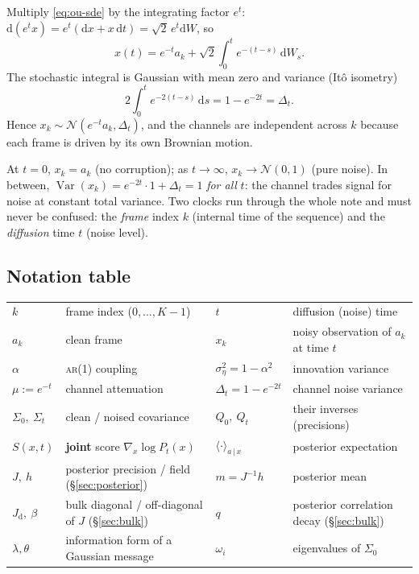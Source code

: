 \documentclass[11pt]{article}
\theoremstyle{definition}
\newcommand{\N}{\mathcal{N}}
\newcommand{\Sig}{\Sigma}
\newcommand{\Dt}{\Delta_t}
\newcommand{\Qt}{Q_t}
\newcommand{\given}{\,|\,}
\newcommand{\dd}{\mathrm{d}}
\newcommand{\Jd}{J_{\mathrm d}}
\DeclareMathOperator{\Var}{Var}
\begin{document}
\begin{derivation}
Multiply \eqref{eq:ou-sde} by the integrating factor $e^{t}$:
$\dd(e^{t}x)=e^{t}(\dd x+x\,\dd t)=\sqrt2\,e^{t}\dd W$, so
\[
  x(t)=e^{-t}a_k+\sqrt2\int_0^t e^{-(t-s)}\,\dd W_s .
\]
The stochastic integral is Gaussian with mean zero and variance (It\^o
isometry)
\[
  2\int_0^t e^{-2(t-s)}\,\dd s=1-e^{-2t}=\Dt .
\]
Hence $x_k\sim\N(e^{-t}a_k,\Dt)$, and the channels are independent across $k$
because each frame is driven by its own Brownian motion.
\end{derivation}

\begin{intuition}
At $t=0$, $x_k=a_k$ (no corruption); as $t\to\infty$, $x_k\to\N(0,1)$ (pure
noise). In between, $\Var(x_k)=e^{-2t}\cdot1+\Dt=1$ \emph{for all} $t$: the
channel trades signal for noise at constant total variance. Two clocks run
through the whole note and must never be confused: the \emph{frame} index $k$
(internal time of the sequence) and the \emph{diffusion} time $t$ (noise
level).
\end{intuition}

\subsection{Notation table}

\begin{center}\small
\begin{tabular}{@{}ll@{\qquad}ll@{}}
\toprule
$k$ & frame index ($0,\dots,K-1$) & $t$ & diffusion (noise) time\\
$a_k$ & clean frame & $x_k$ & noisy observation of $a_k$ at time $t$\\
$\alpha$ & \textsc{ar}(1) coupling & $\sigma_\eta^2=1-\alpha^2$ & innovation variance\\
$\mu:=e^{-t}$ & channel attenuation & $\Dt=1-e^{-2t}$ & channel noise variance\\
$\Sig_0,\ \Sig_t$ & clean / noised covariance & $Q_0,\ \Qt$ & their inverses (precisions)\\
$S(x,t)$ & \textbf{joint} score $\nabla_x\log P_t(x)$ &
  $\langle\cdot\rangle_{a\given x}$ & posterior expectation\\
$J,\ h$ & posterior precision / field (\S\ref{sec:posterior}) &
  $m=J^{-1}h$ & posterior mean\\
$\Jd,\ \beta$ & bulk diagonal / off-diagonal of $J$ (\S\ref{sec:bulk}) &
  $q$ & posterior correlation decay (\S\ref{sec:bulk})\\
$\lambda,\theta$ & information form of a Gaussian message &
  $\omega_i$ & eigenvalues of $\Sig_0$\\
\bottomrule
\end{tabular}
\end{center}
\end{document}
